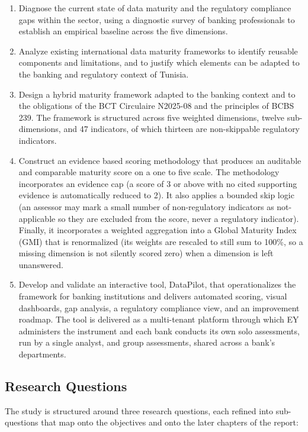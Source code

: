 \begin{enumerate}[label=(\arabic*)]
    \item Diagnose the current state of data maturity and the regulatory compliance gaps within the sector, using a diagnostic survey of banking professionals to establish an empirical baseline across the five dimensions.
    \item Analyze existing international data maturity frameworks to identify reusable components and limitations, and to justify which elements can be adapted to the banking and regulatory context of Tunisia.
    \item Design a hybrid maturity framework adapted to the banking context and to the obligations of the BCT Circulaire N\textdegree{}2025-08 and the principles of BCBS 239. The framework is structured across five weighted dimensions, twelve sub-dimensions, and 47 indicators, of which thirteen are non-skippable regulatory indicators.
    \item Construct an evidence based scoring methodology that produces an auditable and comparable maturity score on a one to five scale. The methodology incorporates an evidence cap (a score of 3 or above with no cited supporting evidence is automatically reduced to 2). It also applies a bounded skip logic (an assessor may mark a small number of non-regulatory indicators as not-applicable so they are excluded from the score, never a regulatory indicator). Finally, it incorporates a weighted aggregation into a Global Maturity Index (GMI) that is renormalized (its weights are rescaled to still sum to 100\%, so a missing dimension is not silently scored zero) when a dimension is left unanswered.
    \item Develop and validate an interactive tool, DataPilot, that operationalizes the framework for banking institutions and delivers automated scoring, visual dashboards, gap analysis, a regulatory compliance view, and an improvement roadmap. The tool is delivered as a multi-tenant platform through which EY administers the instrument and each bank conducts its own solo assessments, run by a single analyst, and group assessments, shared across a bank's departments.
\end{enumerate}

\subsection{Research Questions}

The study is structured around three research questions, each refined into sub-questions that map onto the objectives and onto the later chapters of the report:

